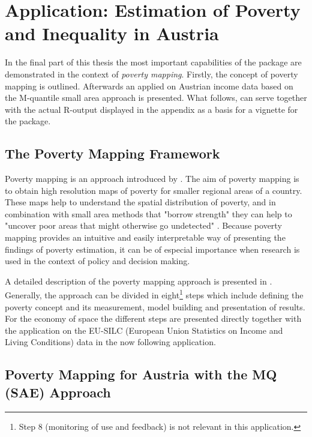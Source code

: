 \section{Application: Estimation of Poverty and Inequality in Austria}\label{Par:Application}

In the final part of this thesis  the most important capabilities of the  package are demonstrated in the context of  \textit{poverty mapping}.  Firstly, the concept of poverty mapping is outlined. Afterwards an applied on Austrian income data based on the M-quantile small area approach is presented. What follows, can serve together with the actual R-output displayed in the appendix as a basis   for a vignette for the  package. 
\subsection{The Poverty Mapping Framework}
Poverty mapping is an approach introduced by \cite{henninger_where_2002}. The aim of poverty mapping is to obtain high resolution maps of poverty  for smaller regional areas of a  country. These maps help to understand the spatial distribution of poverty, and in combination with small area methods that "borrow strength" they can help to "uncover poor areas that might otherwise go undetected" \citep[p.1]{henninger_where_2002}. Because poverty mapping provides an intuitive  and easily interpretable way of presenting the findings of poverty estimation, it can be of especial importance when research is used in the context of policy and decision making. 

A detailed description of the poverty mapping approach is presented in \cite{henninger_where_2002}. Generally, the approach can be divided in eight\footnote{Step 8 (monitoring of use and feedback) is not relevant in this application.} steps which include defining the poverty concept and its measurement, model building and presentation of results. For the economy of space the different steps are presented  directly  together with the application on the EU-SILC (European Union Statistics on Income and Living Conditions) data in the now following application.

\subsection{Poverty Mapping for Austria with the MQ (SAE) Approach}
